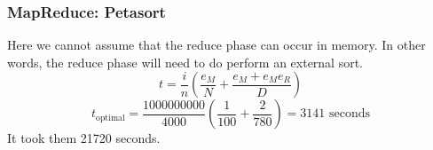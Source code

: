 \documentclass{acm_proc_article-sp}
\begin{document}
\subsubsection{MapReduce: Petasort}
Here we cannot assume that the reduce phase can occur in memory. In other words, the reduce phase will need to do perform an external sort.
\[t = \frac{i}{n} \left( \frac{e_M}{N} + \frac{e_M + e_M e_R}{D} \right)\]
\[t_\text{optimal} = \frac{1000000000}{4000} \left( \frac{1}{100} + \frac{2}{780} \right) = 3141 \text{ seconds}\]
It took them 21720 seconds.




\balancecolumns
\end{document}
